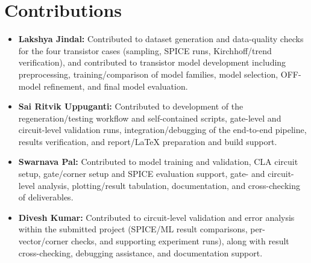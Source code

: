 \documentclass[11pt,a4paper]{article}
\begin{document}
\section*{Contributions}
\begin{itemize}[leftmargin=*]
\item \textbf{Lakshya Jindal:} Contributed to dataset generation and data-quality checks for the four transistor cases (sampling, SPICE runs, Kirchhoff/trend verification), and contributed to transistor model development including preprocessing, training/comparison of model families, model selection, OFF-model refinement, and final model evaluation.
\item \textbf{Sai Ritvik Uppuganti:} Contributed to development of the regeneration/testing workflow and self-contained scripts, gate-level and circuit-level validation runs, integration/debugging of the end-to-end pipeline, results verification, and report/LaTeX preparation and build support.
\item \textbf{Swarnava Pal:} Contributed to model training and validation, CLA circuit setup, gate/corner setup and SPICE evaluation support, gate- and circuit-level analysis, plotting/result tabulation, documentation, and cross-checking of deliverables.
\item \textbf{Divesh Kumar:} Contributed to circuit-level validation and error analysis within the submitted project (SPICE/ML result comparisons, per-vector/corner checks, and supporting experiment runs), along with result cross-checking, debugging assistance, and documentation support.
\end{itemize}
\end{document}
